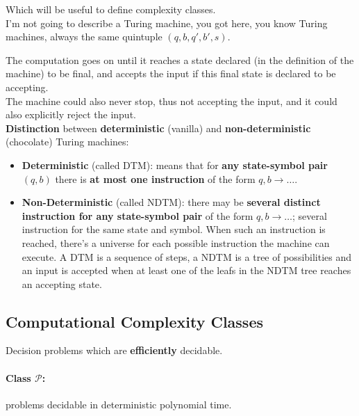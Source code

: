 \documentclass[11pt]{article}
\begin{document}
	Which will be useful to define complexity classes.\\
	
	I'm not going to describe a Turing machine, you got here, you know Turing machines, always the same quintuple $(q,b,q',b',s)$.\\
	
	\newpage
	
	The computation goes on until it reaches a state declared (in the definition of the machine) to be final, and accepts the input if this final state is declared to be accepting.\\
	The machine could also never stop, thus not accepting the input, and it could also explicitly reject the input.\\
	
	
	\textbf{Distinction} between \textbf{deterministic} (vanilla) and \textbf{non-deterministic} (chocolate) Turing machines:
	\begin{itemize}
		\item \textbf{Deterministic} (called DTM): means that for \textbf{any state-symbol pair} $(q,b)$ there is \textbf{at most one instruction} of the form $q,b \rightarrow \dots$.\\
		
		\item \textbf{Non-Deterministic} (called NDTM): there may be \textbf{several distinct instruction for any state-symbol pair} of the form $q,b \rightarrow \dots$; several instruction for the same state and symbol. When such an instruction is reached, there's a universe for each possible instruction the machine can execute. A DTM is a sequence of steps, a NDTM is a tree of possibilities and an input is accepted when at least one of the leafs in the NDTM tree reaches an accepting state.\\
	\end{itemize}
	
	\newpage
	
	\subsection{Computational Complexity Classes}
	
	Decision problems which are \textbf{efficiently} decidable.\\
	
	\paragraph{Class $\mathcal{P}$:} problems decidable in deterministic polynomial time.\\
	
\end{document}
